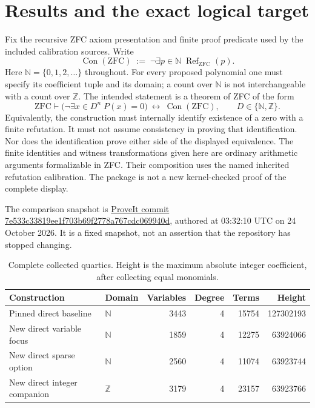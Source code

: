 \documentclass[11pt]{article}
\DeclareMathOperator{\Con}{Con}
\begin{document}
\section{Results and the exact logical target}
\label{sec:target}
Fix the recursive ZFC axiom presentation and finite proof predicate used
by the included calibration sources. Write
\[
 \Con(\mathrm{ZFC})\;:=\;
 \neg\exists p\in\mathbb N\;\operatorname{Ref}_{\mathrm{ZFC}}(p).
\]
Here $\mathbb N=\{0,1,2,\ldots\}$ throughout. For every proposed polynomial
one must specify its coefficient tuple and its domain; a count over
$\mathbb N$ is not interchangeable with a count over $\mathbb Z$.
The intended statement is a theorem of ZFC of the form
\[
 \mathrm{ZFC}\vdash
 \bigl(\neg\exists x\in D^n\;P(x)=0\bigr)
 \ \longleftrightarrow\ \Con(\mathrm{ZFC}),
 \qquad D\in\{\mathbb N,\mathbb Z\}.
\]
Equivalently, the construction must internally identify existence of a
zero with a finite refutation. It must not assume consistency in proving
that identification. Nor does the identification prove either side of
the displayed equivalence. The finite identities and witness
transformations given here are ordinary arithmetic arguments formalizable
in ZFC. Their composition uses the named inherited refutation calibration.
The package is not a new kernel-checked proof of the complete display.

The comparison snapshot is
\href{https://github.com/VladimirReshetnikov/ProveIt/tree/7e533c33819ee1f703b69f2778a767cdc069940d}{ProveIt commit 7e533c33819ee1f703b69f2778a767cdc069940d},
authored at 03:32:10 UTC on 24 October 2026. It is a fixed snapshot, not
an assertion that the repository has stopped changing.

\begin{table}[htbp]
\centering\small
\begin{tabular}{llrrrr}
\toprule
Construction & Domain & Variables & Degree & Terms & Height\\
\midrule
Pinned direct baseline & $\mathbb N$ &3443&4&15754&127302193\\
New direct variable focus & $\mathbb N$ &1859&4&12275&63924066\\
New direct sparse option & $\mathbb N$ &2560&4&11074&63923744\\
New direct integer companion & $\mathbb Z$ &3179&4&23157&63923766\\
\bottomrule
\end{tabular}
\caption{Complete collected quartics. Height is the maximum absolute
integer coefficient, after collecting equal monomials.}
\end{table}
\end{document}
